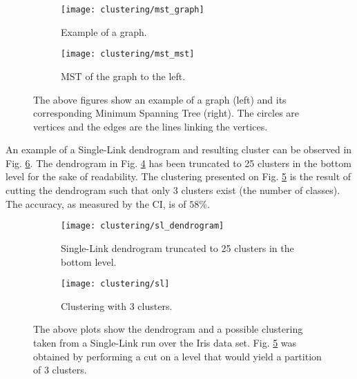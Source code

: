 \begin{figure}[!ht]
    \centering
    \begin{subfigure}[b]{0.3\textwidth}
        \centering
        \texttt{[image: clustering/mst\_graph]}
        \caption{Example of a graph.}
        \label{fig:graph}
    \end{subfigure}
    \hspace{30pt}
    \begin{subfigure}[b]{0.3\textwidth}
        \centering
        \texttt{[image: clustering/mst\_mst]}
        \caption{MST of the graph to the left.}
        \label{fig:graph mst}
    \end{subfigure}

    \caption{The above figures show an example of a graph (left) and its corresponding Minimum Spanning Tree (right). The circles are vertices and the edges are the lines linking the vertices.}
    \label{fig:mst example}
\end{figure}

An example of a Single-Link dendrogram and resulting cluster can be observed in Fig. \ref{fig:sl plots}.
The dendrogram in Fig. \ref{fig:sl dendrogram} has been truncated to 25 clusters in the bottom level for the sake of readability.
The clustering presented on Fig. \ref{fig:sl clustering} is the result of cutting the dendrogram such that only 3 clusters exist (the number of classes).
The accuracy, as measured by the CI, is of $58\%$.

\begin{figure}[!ht]
    \centering
    \begin{subfigure}[b]{0.45\textwidth}
        \centering
        \texttt{[image: clustering/sl\_dendrogram]}
        \caption{Single-Link dendrogram truncated to 25 clusters in the bottom level.}
        \label{fig:sl dendrogram}
    \end{subfigure}
    \begin{subfigure}[b]{0.45\textwidth}
        \centering
        \texttt{[image: clustering/sl]}
        \caption{Clustering with 3 clusters.}
        \label{fig:sl clustering}
    \end{subfigure}

    \caption{The above plots show the dendrogram and a possible clustering taken from a Single-Link run over the Iris data set. Fig. \ref{fig:sl clustering} was obtained by performing a cut on a level that would yield a partition of 3 clusters.}
    \label{fig:sl plots}
\end{figure}





